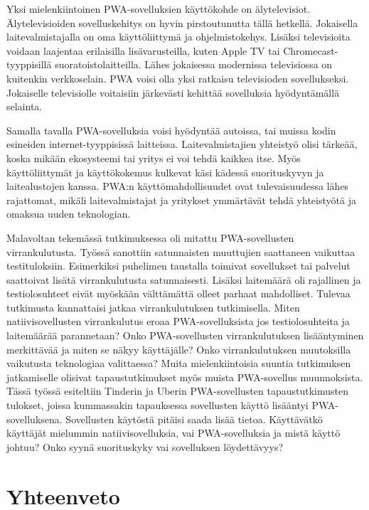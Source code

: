 \documentclass{tktltiki}
\begin{document}
Yksi mielenkiintoinen PWA-sovelluksien käyttökohde on älytelevisiot. Älytelevisioiden sovelluskehitys on hyvin pirstoutunutta tällä hetkellä. Jokaisella laitevalmistajalla on oma käyttöliittymä ja ohjelmistokehys. Lisäksi televisioita voidaan laajentaa erilaisilla lisävarusteilla, kuten Apple TV tai Chromecast-tyyppisillä suoratoistolaitteilla. Lähes jokaisessa modernissa televisiossa on kuitenkin verkkoselain. PWA voisi olla yksi ratkaisu televisioden sovellukseksi. Jokaiselle televisiolle voitaisiin järkevästi kehittää sovelluksia hyödyntämällä selainta.

Samalla tavalla PWA-sovelluksia voisi hyödyntää autoissa, tai muissa kodin esineiden internet-tyyppisissä laitteissa. Laitevalmistajien yhteistyö olisi tärkeää, koska mikään ekosysteemi tai yritys ei voi tehdä kaikkea itse. Myös käyttöliittymät ja käyttökokemus kulkevat käsi kädessä suorituskyvyn ja laitealustojen kanssa. PWA:n käyttömahdollisuudet ovat tulevaisuudessa lähes rajattomat, mikäli laitevalmistajat ja yritykset ymmärtävät tehdä yhteistyötä ja omaksua uuden teknologian. 

Malavoltan tekemässä tutkimuksessa \cite{malavolta2017assessing} oli mitattu PWA-sovellusten virrankulutusta. Työssä sanottiin satunnaisten muuttujien saattaneen vaikuttaa testituloksiin. Esimerkiksi puhelimen taustalla toimivat sovellukset tai palvelut saattoivat lisätä virrankulutusta satunnaisesti. Lisäksi laitemäärä oli rajallinen ja testiolosuhteet eivät myöskään välttämättä olleet parhaat mahdolliset. Tulevaa tutkimusta kannattaisi jatkaa virrankulutuksen tutkimisella. Miten natiivisovellusten virrankulutus eroaa PWA-sovelluksista jos testiolosuhteita ja laitemäärää parannetaan? Onko PWA-sovellusten virrankulutuksen lisääntyminen merkittävää ja miten se näkyy käyttäjälle? Onko virrankulutuksen muutoksilla vaikutusta teknologiaa valittaessa? Muita mielenkiintoisia suuntia tutkimuksen jatkamiselle olisivat tapaustutkimukset myös muista PWA-sovellus muunnoksista. Tässä työssä esiteltiin Tinderin ja Uberin PWA-sovellusten tapaustutkimusten tulokset, joissa kummassakin tapauksessa sovellusten käyttö lisääntyi PWA-sovelluksena. Sovellusten käytöstä pitäisi saada lisää tietoa. Käyttävätkö käyttäjät mielummin natiivisovelluksia, vai PWA-sovelluksia ja mistä käyttö johtuu? Onko syynä suorituskyky vai sovelluksen löydettävyys?

\newpage
\section{Yhteenveto}
\end{document}
